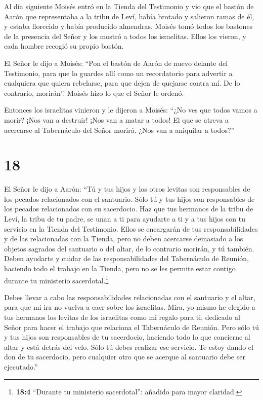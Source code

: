  Al día siguiente Moisés entró en la Tienda del Testimonio y
vio que el bastón de Aarón que representaba a la tribu de Leví, había
brotado y salieron ramas de él, y estaba florecido y había producido
almendras.  Moisés tomó todos los bastones de la presencia
del Señor y los mostró a todos los israelitas. Ellos los vieron, y cada
hombre recogió su propio bastón.

 El Señor le dijo a Moisés: ``Pon el bastón de Aarón de
nuevo delante del Testimonio, para que lo guardes allí como un
recordatorio para advertir a cualquiera que quiera rebelarse, para que
dejen de quejarse contra mí. De lo contrario, morirán''. 
Moisés hizo lo que el Señor le ordenó.

 Entonces los israelitas vinieron y le dijeron a Moisés:
``¿No ves que todos vamos a morir? ¡Nos van a destruir! ¡Nos van a matar
a todos!  El que se atreva a acercarse al Tabernáculo del
Señor morirá. ¿Nos van a aniquilar a todos?''

\hypertarget{section-17}{%
\section{18}\label{section-17}}

 El Señor le dijo a Aarón: ``Tú y tus hijos y los otros
levitas son responsables de los pecados relacionados con el santuario.
Sólo tú y tus hijos son responsables de los pecados relacionados con su
sacerdocio.  Haz que tus hermanos de la tribu de Leví, la
tribu de tu padre, se unan a ti para ayudarte a ti y a tus hijos con tu
servicio en la Tienda del Testimonio.  Ellos se encargarán
de tus responsabilidades y de las relacionadas con la Tienda, pero no
deben acercarse demasiado a los objetos sagrados del santuario o del
altar, de lo contrario morirán, y tú también.  Deben
ayudarte y cuidar de las responsabilidades del Tabernáculo de Reunión,
haciendo todo el trabajo en la Tienda, pero no se les permite estar
contigo durante tu ministerio sacerdotal.\footnote{\textbf{18:4}
  ``Durante tu ministerio sacerdotal'': añadido para mayor claridad.}

 Debes llevar a cabo las responsabilidades relacionadas con
el santuario y el altar, para que mi ira no vuelva a caer sobre los
israelitas.  Mira, yo mismo he elegido a tus hermanos los
levitas de los israelitas como mi regalo para ti, dedicado al Señor para
hacer el trabajo que relaciona el Tabernáculo de Reunión. 
Pero sólo tú y tus hijos son responsables de tu sacerdocio, haciendo
todo lo que concierne al altar y está detrás del velo. Sólo tú debes
realizar ese servicio. Te estoy dando el don de tu sacerdocio, pero
cualquier otro que se acerque al santuario debe ser ejecutado.''

